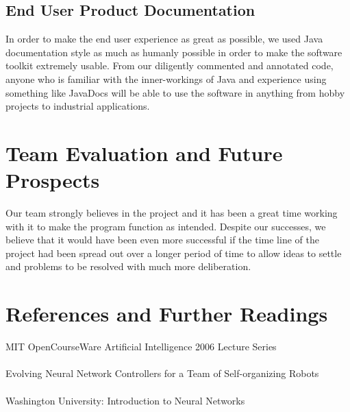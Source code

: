 \documentclass[letterpaper, 10pt]{article}
\begin{document}
	\subsection{End User Product Documentation}
		In order to make the end user experience as great as possible, we used Java documentation style as much as humanly possible in order to make the software toolkit extremely usable. From our diligently commented and annotated code, anyone who is familiar with the inner-workings of Java and experience using something like JavaDocs will be able to use the software in anything from hobby projects to industrial applications.
\section{Team Evaluation and Future Prospects}
	Our team strongly believes in the project and it has been a great time working with it to make the program function as intended. Despite our successes, we believe that it would have been even more successful if the time line of the project had been spread out over a longer period of time to allow ideas to settle and problems to be resolved with much more deliberation.
\cleardoublepage
\section{References and Further Readings}
	MIT OpenCourseWare Artificial Intelligence 2006 Lecture Series \\ \\
	Evolving Neural Network Controllers for a Team of
	Self-organizing Robots\\\\
	Washington University: Introduction to Neural Networks
\end{document}
